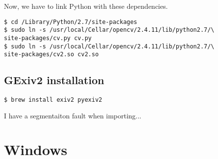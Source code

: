 \documentclass[a4paper, 11pt]{article}
\begin{document}
Now, we have to link Python with these dependencies.

\begin{verbatim}
$ cd /Library/Python/2.7/site-packages
$ sudo ln -s /usr/local/Cellar/opencv/2.4.11/lib/python2.7/\
site-packages/cv.py cv.py
$ sudo ln -s /usr/local/Cellar/opencv/2.4.11/lib/python2.7/\
site-packages/cv2.so cv2.so
\end{verbatim}

\subsection*{GExiv2 installation}

\begin{verbatim}
$ brew install exiv2 pyexiv2
\end{verbatim}

I have a segmentaiton fault when importing...


\section{Windows}
\end{document}
